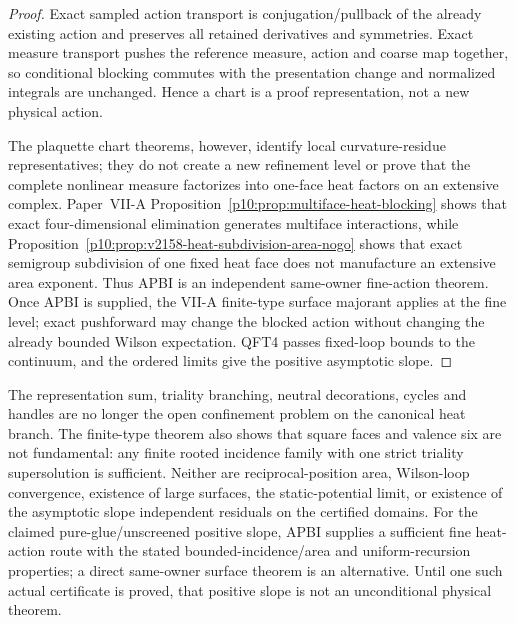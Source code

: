 \documentclass[12pt,a4paper]{article}
\begin{document}
\begin{proof}
Exact sampled action transport is conjugation/pullback of the already existing
action and preserves all retained derivatives and symmetries.  Exact measure
transport pushes the reference measure, action and coarse map together, so
conditional blocking commutes with the presentation change and normalized
integrals are unchanged.  Hence a chart is a proof representation, not a new
physical action.

The plaquette chart theorems, however, identify local curvature-residue
representatives; they do not create a new refinement level or prove that the
complete nonlinear measure factorizes into one-face heat factors on an
extensive complex.  Paper~VII-A Proposition~\ref{p10:prop:multiface-heat-blocking}
shows that exact four-dimensional elimination generates multiface
interactions, while Proposition~\ref{p10:prop:v2158-heat-subdivision-area-nogo}
shows that exact semigroup subdivision of one fixed heat face does not
manufacture an extensive area exponent.  Thus APBI is an independent
same-owner fine-action theorem.  Once APBI is supplied, the VII-A finite-type
surface majorant applies at the fine level; exact pushforward may change the
blocked action without changing the already bounded Wilson expectation.  QFT4
passes fixed-loop bounds to the continuum, and the ordered limits give the
positive asymptotic slope.
\end{proof}

\begin{remark}
\label{p12:rem:v2155-confinement-status}
\label{p12:rem:v2158-confinement-status}
The representation sum, triality branching, neutral decorations, cycles and
handles are no longer the open confinement problem on the canonical heat
branch.  The finite-type theorem also shows that square faces and valence six
are not fundamental: any finite rooted incidence family with one strict
triality supersolution is sufficient.  Neither are reciprocal-position area,
Wilson-loop convergence, existence of large surfaces, the static-potential
limit, or existence of the asymptotic slope independent residuals on the
certified domains.  For the claimed pure-glue/unscreened positive slope,
APBI supplies a sufficient fine heat-action route with the stated
bounded-incidence/area and uniform-recursion properties; a direct same-owner
surface theorem is an alternative.  Until one such actual certificate is
proved, that positive slope is not an unconditional physical theorem.
\end{remark}
\end{document}
